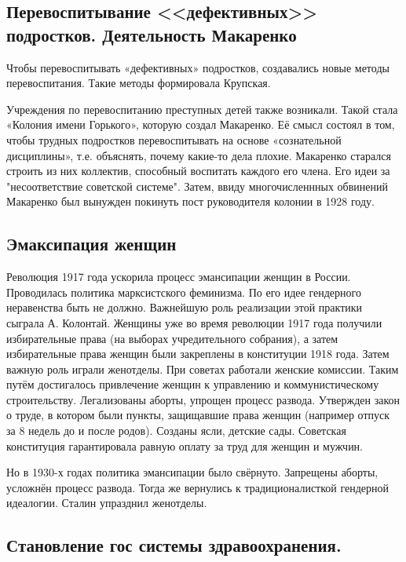 \subsection{Перевоспитывание <<дефективных>> подростков. Деятельность Макаренко}

Чтобы перевоспитывать «дефективных» подростков, создавались новые методы перевоспитания. Такие методы формировала Крупская.

Учреждения по перевоспитанию преступных детей также возникали. Такой стала «Колония имени Горького», которую создал Макаренко. Её смысл состоял в том, чтобы трудных подростков перевоспитывать на основе «сознательной дисциплины», т.е. объяснять, почему какие-то дела плохие. Макаренко старался строить из них коллектив, способный воспитать каждого его члена. Его идеи за "несоответствие советской системе". Затем, ввиду многочисленнных обвинений Макаренко был вынужден покинуть пост руководителя колонии в 1928 году.

\subsection{Эмаксипация женщин}

Революция 1917 года ускорила процесс эмансипации женщин в России. Проводилась политика марксистского феминизма. По его идее гендерного неравенства быть не должно. Важнейшую роль реализации этой практики сыграла А. Колонтай. Женщины уже во время революции 1917 года получили избирательные права (на выборах учредительного собрания), а затем избирательные права женщин были закреплены в конституции 1918 года. Затем важную роль играли женотделы. При советах работали женские комиссии. Таким путём достигалось привлечение женщин к управлению и коммунистическому строительству. Легализованы аборты, упрощен процесс развода. Утвержден закон о труде, в котором были пункты, защищавшие права женщин (например отпуск за 8 недель до и после родов). Созданы ясли, детские сады. Советская конституция гарантировала равную оплату за труд для женщин и мужчин. 

Но в 1930-х годах политика эмансипации было свёрнуто. Запрещены аборты, усложнён процесс развода. Тогда же вернулись к традиционалисткой гендерной идеалогии. Сталин упразднил женотделы.

\subsection{Становление гос системы здравоохранения.}

